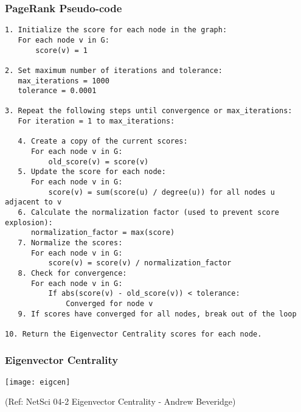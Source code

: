 \begin{frame}[fragile]\frametitle{PageRank Pseudo-code}

\begin{lstlisting}[basicstyle=\tiny]
1. Initialize the score for each node in the graph:
   For each node v in G:
       score(v) = 1
	   
2. Set maximum number of iterations and tolerance:
   max_iterations = 1000
   tolerance = 0.0001
   
3. Repeat the following steps until convergence or max_iterations:
   For iteration = 1 to max_iterations:
   
   4. Create a copy of the current scores:
      For each node v in G:
          old_score(v) = score(v)
   5. Update the score for each node:
      For each node v in G:
          score(v) = sum(score(u) / degree(u)) for all nodes u adjacent to v
   6. Calculate the normalization factor (used to prevent score explosion):
      normalization_factor = max(score)
   7. Normalize the scores:
      For each node v in G:
          score(v) = score(v) / normalization_factor
   8. Check for convergence:
      For each node v in G:
          If abs(score(v) - old_score(v)) < tolerance:
              Converged for node v
   9. If scores have converged for all nodes, break out of the loop
   
10. Return the Eigenvector Centrality scores for each node.
\end{lstlisting}

\end{frame}

\begin{frame}[fragile]\frametitle{Eigenvector Centrality}

\begin{center}
\texttt{[image: eigcen]}

{\tiny (Ref: NetSci 04-2 Eigenvector Centrality - Andrew Beveridge)}
\end{center}	  
\end{frame}

